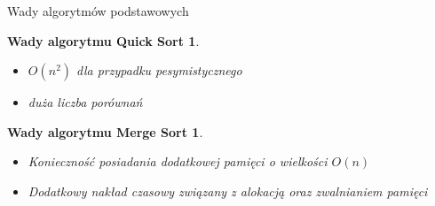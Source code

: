 \begin{frame}[squeeze]{Wady algorytmów podstawowych}
	
	\newtheorem*{quicksort*}{Wady algorytmu Quick Sort}
	\begin{quicksort*}
		\begin{itemize}
			\item $O(n^2)$ dla przypadku pesymistycznego
			\item duża liczba porównań
		\end{itemize}
	\end{quicksort*}

	\newtheorem*{mergesort*}{Wady algorytmu Merge Sort}
	\begin{mergesort*}
		\begin{itemize}
			\item Konieczność posiadania dodatkowej pamięci o wielkości $O(n)$
			\item Dodatkowy nakład czasowy związany z alokacją oraz zwalnianiem pamięci
		\end{itemize}
	\end{mergesort*}
	
\end{frame}